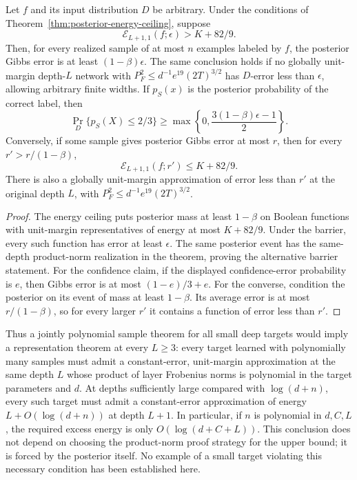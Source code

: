 \begin{corollary}
\label{cor:approximation-energy-obstruction}
Let $f$ and its input distribution $D$ be arbitrary. Under the conditions
of Theorem~\ref{thm:posterior-energy-ceiling}, suppose
\[
 \mathcal E_{L+1,1}(f;\epsilon)>K+82/9.
\]
Then, for every realized sample of at most $n$ examples labeled by $f$,
the posterior Gibbs error is at least $(1-\beta)\epsilon$.
The same conclusion holds if no globally unit-margin depth-$L$
network with $P_F^2\le d^{-1}e^{19}(2T)^{3/2}$ has $D$-error less
than $\epsilon$, allowing arbitrary finite widths.
If $p_S(x)$ is the posterior probability of the correct label, then
\[
 \Pr_D\{p_S(X)\le2/3\}
 \ge \max\left\{0,\frac{3(1-\beta)\epsilon-1}{2}\right\}.
\]
Conversely, if some sample gives posterior Gibbs error at most $r$,
then for every $r'>r/(1-\beta)$,
\[
 \mathcal E_{L+1,1}(f;r')\le K+82/9.
\]
There is also a globally unit-margin approximation of error less than
$r'$ at the original depth $L$, with
$P_F^2\le d^{-1}e^{19}(2T)^{3/2}$.
\end{corollary}

\begin{proof}
The energy ceiling puts posterior mass at least $1-\beta$ on Boolean
functions with unit-margin representatives of energy at most $K+82/9$.
Under the barrier, every such function has error at least $\epsilon$.
The same posterior event has the same-depth product-norm realization
in the theorem, proving the alternative barrier statement.
For the confidence claim, if the displayed confidence-error probability
is $e$, then Gibbs error is at most $(1-e)/3+e$.
For the converse, condition the posterior on its event of mass at least
$1-\beta$. Its average error is at most $r/(1-\beta)$, so for every
larger $r'$ it contains a function of error less than $r'$.
\end{proof}

Thus a jointly polynomial sample theorem for all small deep targets
would imply a representation theorem at every $L\ge3$: every target
learned with polynomially many samples must admit a constant-error,
unit-margin approximation at the same depth $L$ whose product of layer
Frobenius norms is polynomial in the target parameters and $d$.
At depths sufficiently large
compared with $\log(d+n)$, every such target must admit a constant-error
approximation of energy $L+O(\log(d+n))$ at depth $L+1$. In particular,
if $n$ is polynomial in $d,C,L$, the required excess energy is only
$O(\log(d+C+L))$. This conclusion does not depend on choosing the
product-norm proof strategy for the upper bound; it is forced by the
posterior itself. No example of a small target violating this necessary
condition has been established here.
